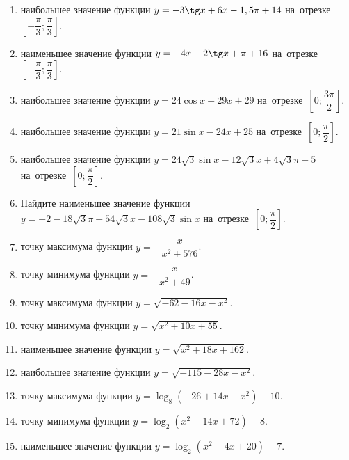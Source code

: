 \documentclass[a4paper,10pt]{article}
\begin{document}
\begin{enumerate}
\item {} наибольшее значение функции $y=-3\tg x +6x-1,5\pi +14$ на~отрезке~$\left[-\dfrac{\pi}{3};\dfrac{\pi}{3}\right]$.

\item {} наименьшее значение функции $y=-4x +2\tg x+\pi+16$ на~отрезке~$\left[-\dfrac{\pi}{3};\dfrac{\pi}{3}\right]$.

\item {} наибольшее значение функции $y=24\cos x-29x+29$ на~отрезке~$\left[0;\dfrac{3\pi}{2}\right]$.

\item {} наибольшее значение функции $y=21\sin x-24x+25$ на~отрезке~$\left[0;\dfrac{\pi}{2}\right]$.

\item {} наибольшее значение функции $y=24\sqrt{3}\sin x-12\sqrt{3}x+4\sqrt{3}\pi +5$ на~отрезке~$\left[0;\dfrac{\pi}{2}\right]$.

\item Найдите наименьшее значение функции $y=-2-18\sqrt{3}\pi+54\sqrt{3}x-108\sqrt{3}\sin x$ на~отрезке~$\left[0;\dfrac{\pi}{2}\right]$.

\item {} точку максимума функции $y=-\dfrac{x}{ x^2 +576}$.

\item {} точку минимума функции $y=-\dfrac{x}{ x^2 +49}$.

\item {} точку максимума функции $y=\sqrt{-62-16x-x^2}$.

\item {} точку минимума функции $y=\sqrt{x^2+10x+55}$.

\item {} наименьшее значение функции $y=\sqrt{x^2+18x+162}$.

\item {} наибольшее значение функции $y=\sqrt{-115-28x-x^2}$.

\item {} точку максимума функции $y=\log_8\left(-26+14x-x^2\right)-10$.

\item {} точку минимума функции $y=\log_2\left(x^2-14x+72\right)-8$.

\item {} наименьшее значение функции $y=\log_2\left(x^2-4x+20\right)-7$.


\end{enumerate}
\end{document}
